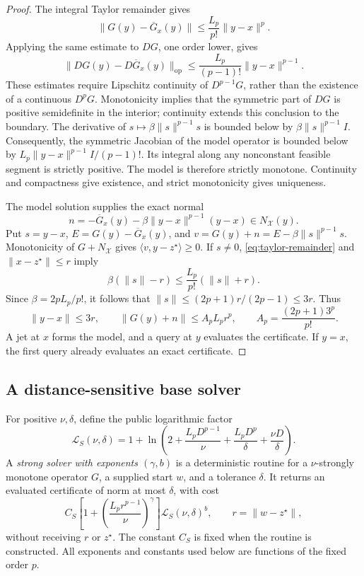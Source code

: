 \documentclass[11pt]{article}
\numberwithin{equation}{section}
\theoremstyle{definition}
\theoremstyle{remark}
\begin{document}
\begin{proof}
The integral Taylor remainder gives
\begin{equation}\label{eq:taylor-remainder}
\|G(y)-\overline G_x(y)\|
\le\frac{L_p}{p!}\|y-x\|^p.
\end{equation}
Applying the same estimate to \(DG\), one order lower, gives
\[
\|DG(y)-D\overline G_x(y)\|_{\mathrm{op}}
\le\frac{L_p}{(p-1)!}\|y-x\|^{p-1}.
\]
These estimates require Lipschitz continuity of \(D^{p-1}G\), rather
than the existence of a continuous \(D^pG\).
Monotonicity implies that the symmetric part of \(DG\) is positive
semidefinite in the interior; continuity extends this conclusion to the
boundary. The derivative of \(s\mapsto\beta\|s\|^{p-1}s\) is bounded
below by \(\beta\|s\|^{p-1}I\). Consequently, the symmetric Jacobian of
the model operator is bounded below by
\(L_p\|y-x\|^{p-1}I/(p-1)!\).
Its integral along any nonconstant feasible segment is strictly positive.
The model is therefore strictly monotone. Continuity and compactness give
existence, and strict monotonicity gives uniqueness.

The model solution supplies the exact normal
\begin{equation}\label{eq:taylor-normal}
n=-\overline G_x(y)-\beta\|y-x\|^{p-1}(y-x)
\in N_{\mathcal X}(y).
\end{equation}
Put \(s=y-x\), \(E=G(y)-\overline G_x(y)\), and
\(v=G(y)+n=E-\beta\|s\|^{p-1}s\).
Monotonicity of \(G+N_{\mathcal X}\) gives
\(\langle v,y-z^\star\rangle\ge0\). If \(s\ne0\),
\eqref{eq:taylor-remainder} and \(\|x-z^\star\|\le r\) imply
\[
\beta(\|s\|-r)\le\frac{L_p}{p!}(\|s\|+r).
\]
Since \(\beta=2pL_p/p!\), it follows that
\(\|s\|\le(2p+1)r/(2p-1)\le3r\). Thus
\begin{equation}\label{eq:taylor-certificate}
\|y-x\|\le3r,
\qquad
\|G(y)+n\|\le A_pL_pr^p,
\qquad A_p=\frac{(2p+1)3^p}{p!}.
\end{equation}
A jet at \(x\) forms the model, and a query at \(y\) evaluates the
certificate. If \(y=x\), the first query already evaluates an exact
certificate.
\end{proof}

\subsection{A distance-sensitive base solver}

For positive \(\nu,\delta\), define the public logarithmic factor
\[
\mathcal L_S(\nu,\delta)
=1+\ln\!\left(2+\frac{L_pD^{p-1}}{\nu}
                +\frac{L_pD^p}{\delta}
                +\frac{\nu D}{\delta}\right).
\]
A \emph{strong solver with exponents \((\gamma,b)\)} is a deterministic
routine for a \(\nu\)-strongly monotone operator \(G\), a supplied start
\(w\), and a tolerance \(\delta\). It returns an evaluated certificate
of norm at most \(\delta\), with cost
\[
C_S\left[1+\left(\frac{L_pr^{p-1}}{\nu}\right)^\gamma\right]
\mathcal L_S(\nu,\delta)^b,
\qquad r=\|w-z^\star\|,
\]
without receiving \(r\) or \(z^\star\). The constant \(C_S\) is fixed
when the routine is constructed. All exponents and constants used below
are functions of the fixed order \(p\).
\end{document}
